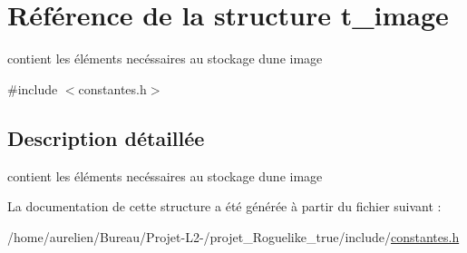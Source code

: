 \hypertarget{structt__image}{}\section{Référence de la structure t\+\_\+image}
\label{structt__image}


contient les éléments necéssaires au stockage d\textquotesingle{}une image  




{\ttfamily \#include $<$constantes.\+h$>$}



\subsection{Description détaillée}
contient les éléments necéssaires au stockage d\textquotesingle{}une image 

La documentation de cette structure a été générée à partir du fichier suivant \+:\begin{DoxyCompactItemize}
\item 
/home/aurelien/\+Bureau/\+Projet-\/\+L2-\//projet\+\_\+\+Roguelike\+\_\+true/include/\hyperlink{constantes_8h}{constantes.\+h}\end{DoxyCompactItemize}
